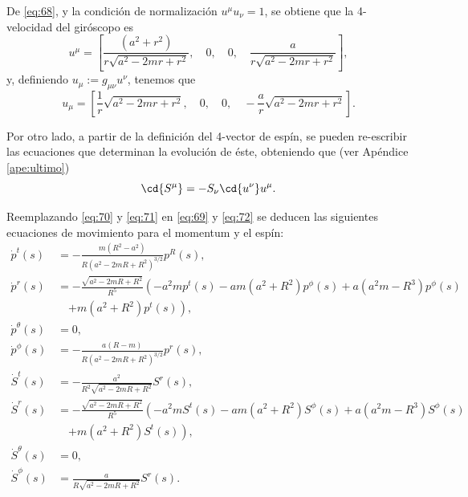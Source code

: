 De \eqref{eq:68}, y la condición de normalización $u^{\mu}u_{\nu} = 1$, se obtiene que la 4-velocidad del giróscopo es
\begin{equation}
\label{eq:70}
u^{\mu} = \left [ \frac{\left(a^{2} + r^{2}\right)}{r\sqrt{a^{2} - 2 m r + r^{2}}}, \quad 0, \quad 0, \quad \frac{a}{r\sqrt{a^{2} - 2 m r + r^{2}}}\right ],
\end{equation}
y, definiendo $u_{\mu} := g_{\mu \nu} u^{\nu}$, tenemos que
\begin{equation}
\label{eq:71}
u_{\mu} = \left [ \frac{1}{r}\sqrt{a^{2} - 2 m r + r^{2}}, \quad 0, \quad 0, \quad -\frac{a}{r} \sqrt{a^{2} - 2 m r + r^{2}} \right ].
\end{equation}

Por otro lado, a partir de la definición del 4-vector de espín, se pueden re-escribir las ecuaciones que determinan la evolución de éste, obteniendo que (ver Apéndice \ref{ape:ultimo})
\begin{equation}
\label{eq:72}
\cd{S^{\mu}} = -S_{\nu} \cd{u^{\nu}} u^{\mu}.
\end{equation}

Reemplazando \eqref{eq:70} y \eqref{eq:71} en \eqref{eq:69} y \eqref{eq:72} se deducen las siguientes ecuaciones de movimiento para el momentum y el espín:
\begin{align}
\dot{p}^t(s) &= -\frac{m(R^2-a^2)}{R(a^2-2mR+R^2)^{3/2}} p^R(s),\\
\nonumber
\dot{p}^r(s) &= -\frac{\sqrt{a^2-2mR+R^2}}{R^5} \left( -a^{2}m p^t(s) - a m \left(a^{2} + R^{2}\right) p^{\phi}(s) + a \left(a^{2} m - R^{3}\right) p^{\phi}(s) \right.\\
& \quad \left. + m \left(a^{2} + R^{2} \right) p^t(s) \right),\\
\dot{p}^{\theta}(s) &= 0,\\
\dot{p}^{\phi}(s) &= -\frac{a(R-m)}{R(a^2-2mR+R^2)^{3/2}} p^r(s),\\
\dot{S}^t(s) &= -\frac{a^2}{R^2 \sqrt{a^2-2mR + R^2}} S^r(s),\\
\nonumber
\dot{S}^r(s) &= -\frac{\sqrt{a^2-2mR+R^2}}{R^5} \left( - a^{2} m S^t(s) - a m \left(a^{2} + R^{2}\right) S^{\phi}(s) + a \left(a^{2} m - R^{3}\right) S^{\phi}(s) \right.\\
& \quad \left. + m \left(a^{2} + R^{2} \right) S^t(s) \right),\\
\dot{S}^{\theta}(s) &= 0,\\
\dot{S}^{\phi}(s) &= \frac{a}{R\sqrt{a^2-2mR+R^2}} S^r(s).
\end{align} 

